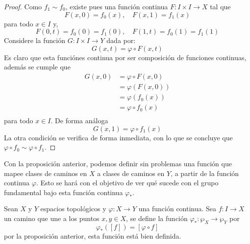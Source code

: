\documentclass[12pt]{report}
\theoremstyle{largebreak}
\newcommand\cf[3]{\ensuremath{#1:#2\rightarrow#3}}
\begin{document}
    \begin{proof}
        Como $f_1\sim f_0$, existe pues una función continua $\cf{F}{I\times I}{X}$ tal que
        \begin{equation*}
            F(x,0)=f_0(x),\quad F(x,1)=f_1(x)
        \end{equation*}
        para todo $x\in I$ y,
        \begin{equation*}
            F(0,t)=f_0(0)=f_1(0),\quad F(1,t)=f_0(1)=f_1(1)
        \end{equation*}
        Considere la función $\cf{G}{I\times I}{Y}$ dada por:
        \begin{equation*}
            G(x,t)=\varphi\circ F(x,t)
        \end{equation*}
        Es claro que esta funciónes continua por ser composición de funciones continuas, además se cumple que
        \begin{equation*}
            \begin{split}
                G(x,0)&=\varphi\circ F(x,0)\\
                &=\varphi (F(x,0))\\
                &=\varphi (f_0(x))\\
                &=\varphi\circ f_0(x)\\
            \end{split}
        \end{equation*}
        para todo $x\in I$. De forma análoga
        \begin{equation*}
            G(x,1)=\varphi\circ f_1(x)
        \end{equation*}
        La otra condición se verifica de forma inmediata, con lo que se concluye que $\varphi\circ f_0\sim \varphi\circ f_1$.
    \end{proof}

    Con la proposición anterior, podemos definir sin problemas una función que mapee clases de caminos en $X$ a clases de caminos en $Y$, a partir de la función continua $\varphi$. Esto se hará con el objetivo de ver qué sucede con el grupo fundamental bajo esta función continua $\varphi_*$.

    \begin{mydef}
        Sean $X$ y $Y$ espacios topológicos y $\cf{\varphi}{X}{Y}$ una función continua. Sea $\cf{f}{I}{X}$ un camino que une a los puntos $x,y\in X$, se define la función $\cf{\varphi_*}{\wp_X}{\wp_Y}$ por
        \begin{equation*}
            \varphi_*([f])=[\varphi\circ f]
        \end{equation*}
        por la proposición anterior, esta función está bien definida.
    \end{mydef}
\end{document}
